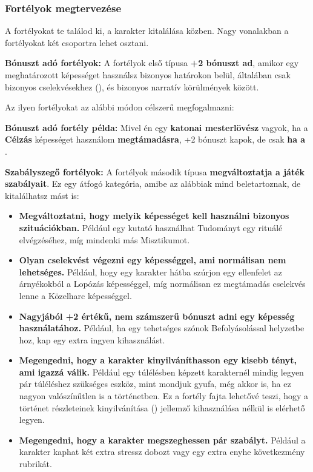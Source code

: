 \subsubsection{Fortélyok megtervezése}

A fortélyokat te találod ki, a karakter kitalálása közben. Nagy vonalakban a fortélyokat két csoportra lehet osztani.

\textbf{Bónuszt adó fortélyok:} A fortélyok első típusa \textbf{+2 bónuszt ad}, amikor egy meghatározott képességet használsz bizonyos határokon belül, általában csak bizonyos cselekvésekhez (), és bizonyos narratív körülmények között.

Az ilyen fortélyokat az alábbi módon célszerű megfogalmazni:


\textbf{Bónuszt adó fortély példa:} Mivel én egy \textbf{katonai mesterlövész} vagyok, ha a \textbf{Célzás} képességet használom \textbf{megtámadásra}, +2 bónuszt kapok, de csak \textbf{ha a }.

\textbf{Szabályszegő fortélyok:} A fortélyok második típusa \textbf{megváltoztatja a játék szabályait}. Ez egy átfogó kategória, amibe az alábbiak mind beletartoznak, de kitalálhatsz mást is:

\begin{itemize}
    \item \textbf{Megváltoztatni, hogy melyik képességet kell használni bizonyos szituációkban.} Például egy kutató használhat Tudományt egy rituálé elvégzéséhez, míg mindenki más Misztikumot.
    \item \textbf{Olyan cselekvést végezni egy képességgel, ami normálisan nem lehetséges.} Például, hogy egy karakter hátba szúrjon egy ellenfelet az árnyékokból a Lopózás képességgel, míg normálisan ez megtámadás cselekvés lenne a Közelharc képességgel.
    \item \textbf{Nagyjából +2 értékű, nem számszerű bónuszt adni egy képesség használatához.} Például, ha egy tehetséges szónok Befolyásolással helyzetbe hoz, kap egy extra ingyen kihasználást.
    \item \textbf{Megengedni, hogy a karakter kinyilváníthasson egy kisebb tényt, ami igazzá válik.} Például egy túlélésben képzett karakternél mindig legyen pár túléléshez szükséges eszköz, mint mondjuk gyufa, még akkor is, ha ez nagyon valószínűtlen is a történetben. Ez a fortély fajta lehetővé teszi, hogy a történet részleteinek kinyilvánítása () jellemző kihasználása nélkül is elérhető legyen.
    \item \textbf{Megengedni, hogy a karakter megszeghessen pár szabályt.} Például a karakter kaphat két extra stressz dobozt vagy egy extra enyhe következmény rubrikát.
\end{itemize}

